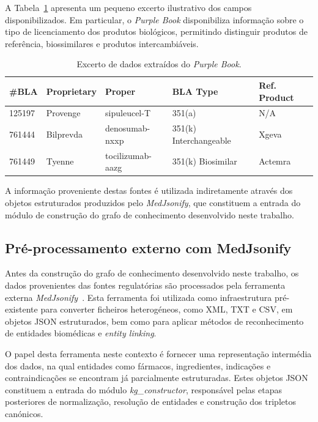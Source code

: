 A Tabela~\ref{tab:purple_book_sample} apresenta um pequeno excerto ilustrativo dos campos disponibilizados. Em particular, o \emph{Purple Book} disponibiliza informação sobre o tipo de licenciamento dos produtos biológicos, permitindo distinguir produtos de referência, biossimilares e produtos intercambiáveis.

\begin{table}[!ht]
\centering
\caption{Excerto de dados extraídos do \emph{Purple Book}.}
\label{tab:purple_book_sample}
\footnotesize
\begin{tabular}{l l l l l}
\hline
\textbf{\#BLA} & \textbf{Proprietary} & \textbf{Proper} & \textbf{BLA Type} & \textbf{Ref. Product} \\
\hline
125197 & Provenge & sipuleucel-T & 351(a) & N/A \\
761444 & Bilprevda & denosumab-nxxp & 351(k) Interchangeable & Xgeva \\
761449 & Tyenne & tocilizumab-aazg & 351(k) Biosimilar & Actemra \\
\hline
\end{tabular}
\end{table}

A informação proveniente destas fontes é utilizada indiretamente através dos objetos estruturados produzidos pelo \emph{MedJsonify}, que constituem a entrada do módulo de construção do grafo de conhecimento desenvolvido neste trabalho.

\subsection{Pré-processamento externo com MedJsonify}
\label{subsec:medjsonify}
Antes da construção do grafo de conhecimento desenvolvido neste trabalho, os dados provenientes das fontes regulatórias são processados pela ferramenta externa \emph{MedJsonify}~\cite{pereira2025mapping}. Esta ferramenta foi utilizada como infraestrutura pré-existente para converter ficheiros heterogéneos, como XML, TXT e CSV, em objetos JSON estruturados, bem como para aplicar métodos de reconhecimento de entidades biomédicas e \emph{entity linking}.

O papel desta ferramenta neste contexto é fornecer uma representação intermédia dos dados, na qual entidades como fármacos, ingredientes, indicações e contraindicações se encontram já parcialmente estruturadas. Estes objetos JSON constituem a entrada do módulo \emph{kg\_constructor}, responsável pelas etapas posteriores de normalização, resolução de entidades e construção dos tripletos canónicos.

